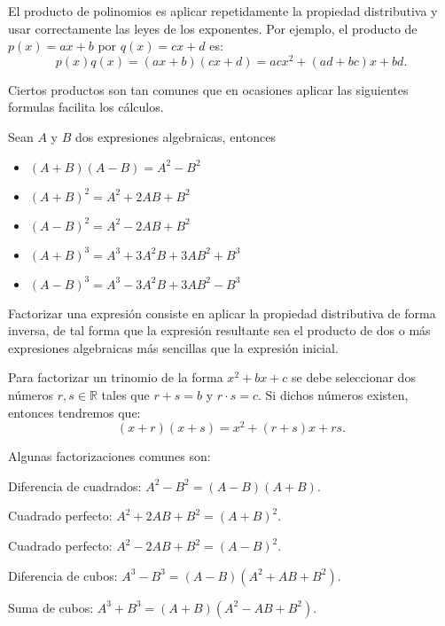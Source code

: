 \documentclass[a4,11pt]{aleph-notas}
\begin{document}
\begin{prop}
	El producto de polinomios es aplicar repetidamente la propiedad distributiva y usar correctamente las leyes de los exponentes. Por ejemplo, el producto de $p(x) = ax+b$ por $q(x) = cx+d$ es:
	$$
	p(x)q(x) = (ax+b)(cx+d) = acx^2 + (ad + bc)x + bd.
	$$
\end{prop}

\begin{prop}
    Ciertos productos son tan comunes que en ocasiones aplicar las siguientes formulas facilita los c\'alculos.
    
    Sean $A$ y $B$ dos expresiones algebraicas, entonces
    
    \begin{itemize}[leftmargin=*]
    	\item $(A+B)(A-B) = A^2 - B^2$
    	\item $(A+B)^2 = A^2 + 2AB + B^2$
    	\item $(A-B)^2 = A^2 - 2AB + B^2$
    	\item $(A+B)^3 = A^3 + 3A^2B + 3AB^2 +B^3$
        \item $(A-B)^3 = A^3 - 3A^2B + 3AB^2 -B^3$
    \end{itemize}
\end{prop}

\begin{defi}
    Factorizar una expresi\'on consiste en aplicar la propiedad distributiva de forma inversa, de tal forma que la expresi\'on resultante sea el producto de dos o m\'as expresiones algebraicas m\'as sencillas que la expresi\'on inicial.
\end{defi}

\begin{prop}
    Para factorizar un trinomio de la forma $x^2 + bx + c$ se debe seleccionar dos n\'umeros $r,s \in \mathbb{R}$ tales que $r+s = b$ y $r\cdot s = c$. Si dichos n\'umeros existen, entonces tendremos que:
    $$
    (x+r)(x+s) = x^2 + (r+s)x + rs.
    $$
\end{prop}

\begin{prop}
    Algunas factorizaciones comunes son:
    \item Diferencia de cuadrados: $A^2 - B^2 = (A- B)(A+B)$.
    \item Cuadrado perfecto: $A^2 + 2AB + B^2 = (A+B)^2$.
    \item Cuadrado perfecto: $A^2 - 2AB + B^2 = (A-B)^2$.
    \item Diferencia de cubos: $A^3 - B^3 = (A-B)(A^2 + AB + B^2)$.
    \item Suma de cubos: $A^3 + B^3 = (A+B)(A^2 - AB + B^2)$.
\end{prop}
\end{document}
